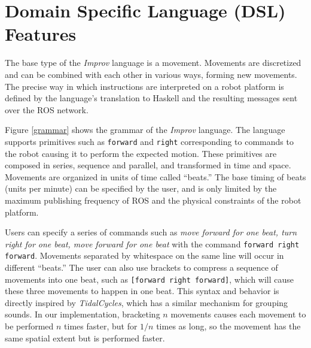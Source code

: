 \documentclass[sigchi-a]{acmart}
\begin{document}
\section{Domain Specific Language (DSL) Features}\label{domain-specific-language-design}


The base type of the \emph{Improv} language is a movement. Movements are
discretized and can be combined with each other in various ways, forming new
movements. The precise way in which instructions are interpreted on a robot
platform is defined by the language's translation to Haskell and the resulting
messages sent over the ROS network.

Figure \ref{grammar} shows the grammar of the \emph{Improv} language.
The language supports primitives such as \texttt{forward} and \texttt{right}
corresponding to commands to the robot causing it to perform the expected
motion. These primitives are composed in series, sequence and parallel, and
transformed in time and space. Movements are organized in units of time called 
``beats.'' The base timing of beats (units per minute) can be specified by the
user, and is only limited by the maximum publishing frequency of ROS and the
physical constraints of the robot platform.

Users can specify a series of commands such as \emph{move forward for
one beat, turn right for one beat, move forward for one beat} with the
command \texttt{forward right forward}. Movements separated by whitespace 
on the same line will occur in different ``beats.''
The user can also use brackets to compress a sequence of movements into
one beat, such as \texttt{[forward right forward]}, which will
cause these three movements to happen in one beat. This syntax and behavior is directly 
inspired by \emph{TidalCycles}, which has a similar mechanism for grouping
sounds. In our implementation,
bracketing $n$ movements causes each movement to be performed $n$
times faster, but for $1/n$ times as long, so the movement has the
same spatial extent but is performed faster.
\end{document}
